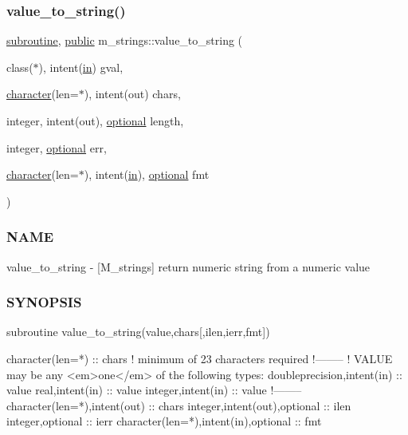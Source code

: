 \subsubsection{\texorpdfstring{value\+\_\+to\+\_\+string()}{value\_to\_string()}}
{\footnotesize\ttfamily \hyperlink{M__stopwatch_83_8txt_acfbcff50169d691ff02d4a123ed70482}{subroutine}, \hyperlink{M__stopwatch_83_8txt_a2f74811300c361e53b430611a7d1769f}{public} m\+\_\+strings\+::value\+\_\+to\+\_\+string (\begin{DoxyParamCaption}\item[{class($\ast$), intent(\hyperlink{M__journal_83_8txt_afce72651d1eed785a2132bee863b2f38}{in})}]{gval,  }\item[{\hyperlink{option__stopwatch_83_8txt_abd4b21fbbd175834027b5224bfe97e66}{character}(len=$\ast$), intent(out)}]{chars,  }\item[{integer, intent(out), \hyperlink{option__stopwatch_83_8txt_aa4ece75e7acf58a4843f70fe18c3ade5}{optional}}]{length,  }\item[{integer, \hyperlink{option__stopwatch_83_8txt_aa4ece75e7acf58a4843f70fe18c3ade5}{optional}}]{err,  }\item[{\hyperlink{option__stopwatch_83_8txt_abd4b21fbbd175834027b5224bfe97e66}{character}(len=$\ast$), intent(\hyperlink{M__journal_83_8txt_afce72651d1eed785a2132bee863b2f38}{in}), \hyperlink{option__stopwatch_83_8txt_aa4ece75e7acf58a4843f70fe18c3ade5}{optional}}]{fmt }\end{DoxyParamCaption})}



\subsubsection*{N\+A\+ME}

value\+\_\+to\+\_\+string -\/ \mbox{[}M\+\_\+strings\mbox{]} return numeric string from a numeric value 

\subsubsection*{S\+Y\+N\+O\+P\+S\+IS}

\begin{DoxyVerb}subroutine value_to_string(value,chars[,ilen,ierr,fmt])

 character(len=*) :: chars  ! minimum of 23 characters required
 !--------
 ! VALUE may be any <em>one</em> of the following types:
 doubleprecision,intent(in)               :: value
 real,intent(in)                          :: value
 integer,intent(in)                       :: value
 !--------
 character(len=*),intent(out)             :: chars
 integer,intent(out),optional             :: ilen
 integer,optional                         :: ierr
 character(len=*),intent(in),optional     :: fmt
\end{DoxyVerb}


